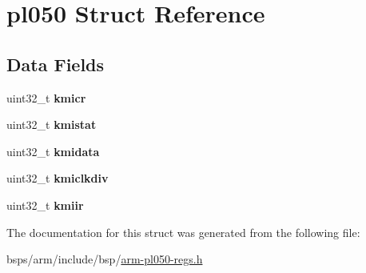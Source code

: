 \hypertarget{structpl050}{}\section{pl050 Struct Reference}
\label{structpl050}
\subsection*{Data Fields}
\begin{DoxyCompactItemize}
\item 
\mbox{\label{structpl050_a9003f71d09d98818157a8d3c86424e44}} 
uint32\+\_\+t {\bfseries kmicr}
\item 
\mbox{\label{structpl050_a88363b92e1eba90d9ddd3ad7554f8a32}} 
uint32\+\_\+t {\bfseries kmistat}
\item 
\mbox{\label{structpl050_aa2876b43f2c82191ae82ddccb6f6cfd1}} 
uint32\+\_\+t {\bfseries kmidata}
\item 
\mbox{\label{structpl050_a2dab093b37c07a10649865e86a01c2d8}} 
uint32\+\_\+t {\bfseries kmiclkdiv}
\item 
\mbox{\label{structpl050_aa130e2ae158e303e1744fd985edad733}} 
uint32\+\_\+t {\bfseries kmiir}
\end{DoxyCompactItemize}


The documentation for this struct was generated from the following file\+:\begin{DoxyCompactItemize}
\item 
bsps/arm/include/bsp/\mbox{\hyperlink{arm-pl050-regs_8h}{arm-\/pl050-\/regs.\+h}}\end{DoxyCompactItemize}
